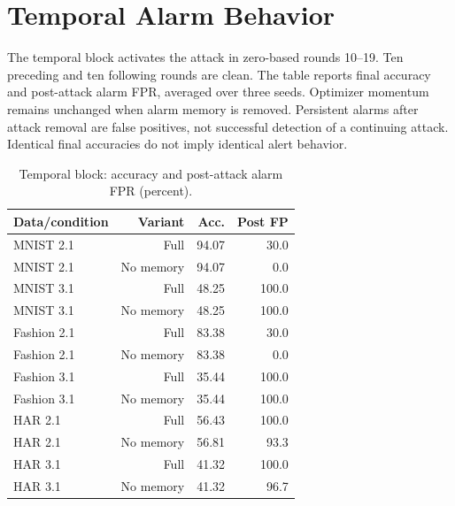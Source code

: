 \documentclass[journal]{IEEEtran}
\begin{document}
\section{Temporal Alarm Behavior}
The temporal block activates the attack in zero-based rounds 10--19. Ten preceding and ten following rounds are clean. The table reports final accuracy and post-attack alarm FPR, averaged over three seeds. Optimizer momentum remains unchanged when alarm memory is removed. Persistent alarms after attack removal are false positives, not successful detection of a continuing attack. Identical final accuracies do not imply identical alert behavior.
\begin{table}[!t]
\centering\scriptsize
\caption{Temporal block: accuracy and post-attack alarm FPR (percent).}
\begin{tabular}{lrrr}
\toprule
Data/condition & Variant & Acc. & Post FP \\
\midrule
MNIST 2.1 & Full & 94.07 & 30.0 \\
MNIST 2.1 & No memory & 94.07 & 0.0 \\
MNIST 3.1 & Full & 48.25 & 100.0 \\
MNIST 3.1 & No memory & 48.25 & 100.0 \\
Fashion 2.1 & Full & 83.38 & 30.0 \\
Fashion 2.1 & No memory & 83.38 & 0.0 \\
Fashion 3.1 & Full & 35.44 & 100.0 \\
Fashion 3.1 & No memory & 35.44 & 100.0 \\
HAR 2.1 & Full & 56.43 & 100.0 \\
HAR 2.1 & No memory & 56.81 & 93.3 \\
HAR 3.1 & Full & 41.32 & 100.0 \\
HAR 3.1 & No memory & 41.32 & 96.7 \\
\bottomrule
\end{tabular}
\end{table}
\end{document}
